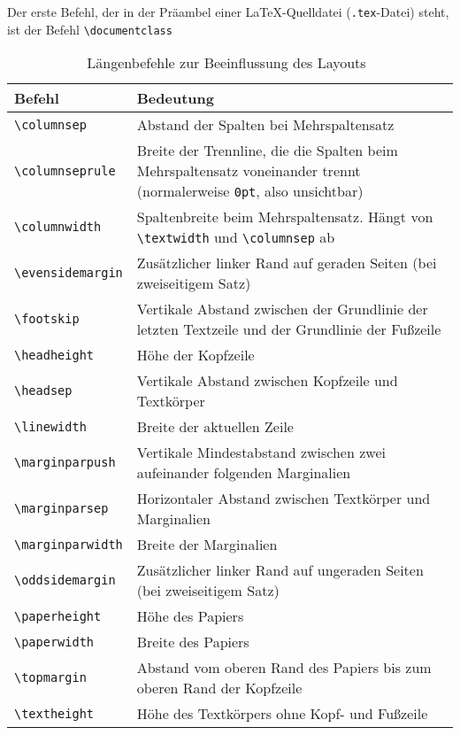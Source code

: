 Der erste Befehl, der in der Präambel einer \LaTeX-Quelldatei (\verb!.tex!-Datei) steht, ist der Befehl \verb!\documentclass!
\begin{document}
\begin{table}[h!tb]
\centering
\caption[Längenbefehle zur Beeinflussung des Layouts]{Längenbefehle zur Beeinflussung des Layouts~\cite{GoossensMittelachSamarin2000}}
\label{Tabelle_Längenbefehle_Layout}       %
\begin{tabularx}{\textwidth}{lX}
\hline
Befehl & Bedeutung \\
\hline
\texttt{\textbackslash columnsep} & Abstand der Spalten 
bei Mehrspaltensatz \\
\texttt{\textbackslash columnseprule} & Breite der Trennline, die die
Spalten beim Mehrspaltensatz voneinander trennt (normalerweise \texttt{0pt},
also unsichtbar) \\
\texttt{\textbackslash columnwidth} & Spaltenbreite beim Mehrspaltensatz.
Hängt von \texttt{\textbackslash textwidth} und 
\texttt{\textbackslash columnsep} ab\\
\texttt{\textbackslash evensidemargin} & Zusätzlicher linker Rand auf geraden
Seiten (bei zweiseitigem Satz)\\
\texttt{\textbackslash footskip} & Vertikale Abstand zwischen der 
Grundlinie der letzten Textzeile und der Grundlinie der Fußzeile\\
\texttt{\textbackslash headheight} & Höhe der Kopfzeile\\
\texttt{\textbackslash headsep} & Vertikale Abstand zwischen Kopfzeile und
Textkörper\\
\texttt{\textbackslash linewidth} & Breite der aktuellen Zeile\\
\texttt{\textbackslash marginparpush} & Vertikale Mindestabstand zwischen
zwei aufeinander folgenden Marginalien\\
\texttt{\textbackslash marginparsep} & Horizontaler Abstand zwischen 
Textkörper und Marginalien\\
\texttt{\textbackslash marginparwidth} & Breite der Marginalien \\
\texttt{\textbackslash oddsidemargin} & Zusätzlicher linker Rand auf ungeraden
Seiten (bei zweiseitigem Satz)\\
\texttt{\textbackslash paperheight} & Höhe des Papiers \\
\texttt{\textbackslash paperwidth} & Breite des Papiers \\
\texttt{\textbackslash topmargin} & Abstand vom oberen Rand des Papiers
bis zum oberen Rand der Kopfzeile\\
\texttt{\textbackslash textheight} & Höhe des Textkörpers
ohne Kopf- und Fußzeile\\

\end{tabularx}
\end{table}
\end{document}
